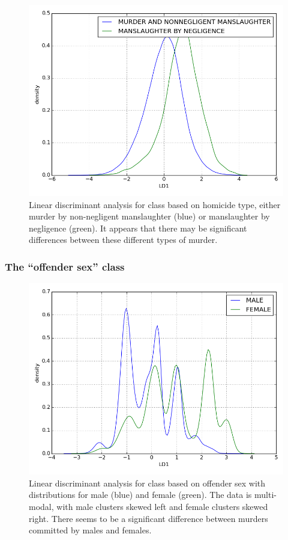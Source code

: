 \documentclass{evanarticle}
\begin{document}
\begin{figure}[H]
  \centering
    \includegraphics[width=\linewidth]{images/homicide/type.png}
  \caption{Linear discriminant analysis for class based on homicide type, either murder by non-negligent manslaughter (blue) or manslaughter by negligence (green).  It appears that there may be significant differences between these different types of murder.}
\end{figure}

\subsubsection{The ``offender sex'' class}

\begin{figure}[H]
  \centering
    \includegraphics[width=\linewidth]{images/offn_sex/offn_sex.png}
  \caption{Linear discriminant analysis for class based on offender sex with distributions for male (blue) and female (green).  The data is multi-modal, with male clusters skewed left and female clusters skewed right.  There seems to be a significant difference between murders committed by males and females.}
\end{figure}
\end{document}
